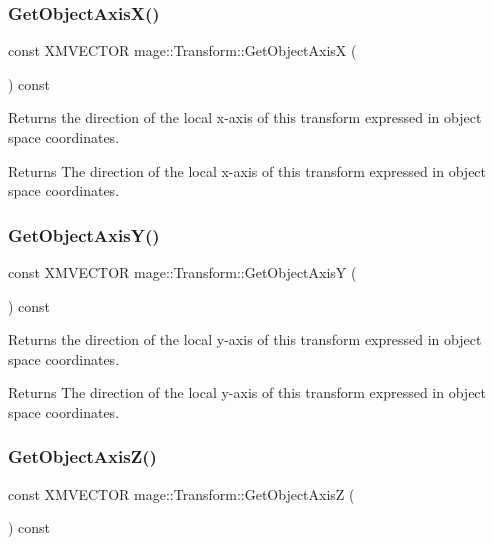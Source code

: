 \subsubsection{\texorpdfstring{Get\+Object\+Axis\+X()}{GetObjectAxisX()}}
{\footnotesize\ttfamily const X\+M\+V\+E\+C\+T\+OR mage\+::\+Transform\+::\+Get\+Object\+AxisX (\begin{DoxyParamCaption}{ }\end{DoxyParamCaption}) const\hspace{0.3cm}{\ttfamily [noexcept]}}

Returns the direction of the local x-\/axis of this transform expressed in object space coordinates.

\begin{DoxyReturn}{Returns}
The direction of the local x-\/axis of this transform expressed in object space coordinates. 
\end{DoxyReturn}
\hypertarget{structmage_1_1_transform_a8638ea8b26dcd32508c267151c3adcfe}{}\label{structmage_1_1_transform_a8638ea8b26dcd32508c267151c3adcfe} 
\subsubsection{\texorpdfstring{Get\+Object\+Axis\+Y()}{GetObjectAxisY()}}
{\footnotesize\ttfamily const X\+M\+V\+E\+C\+T\+OR mage\+::\+Transform\+::\+Get\+Object\+AxisY (\begin{DoxyParamCaption}{ }\end{DoxyParamCaption}) const\hspace{0.3cm}{\ttfamily [noexcept]}}

Returns the direction of the local y-\/axis of this transform expressed in object space coordinates.

\begin{DoxyReturn}{Returns}
The direction of the local y-\/axis of this transform expressed in object space coordinates. 
\end{DoxyReturn}
\hypertarget{structmage_1_1_transform_a0f1249835596278a430c63d74a86906a}{}\label{structmage_1_1_transform_a0f1249835596278a430c63d74a86906a} 
\subsubsection{\texorpdfstring{Get\+Object\+Axis\+Z()}{GetObjectAxisZ()}}
{\footnotesize\ttfamily const X\+M\+V\+E\+C\+T\+OR mage\+::\+Transform\+::\+Get\+Object\+AxisZ (\begin{DoxyParamCaption}{ }\end{DoxyParamCaption}) const\hspace{0.3cm}{\ttfamily [noexcept]}}

